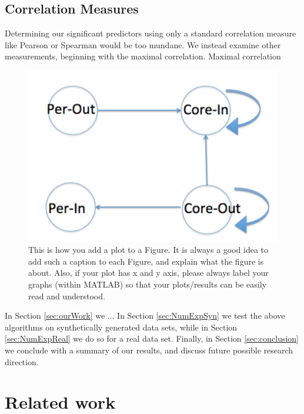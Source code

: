 \documentclass[10pt]{siamltex}
\begin{document}
\subsection{Correlation Measures}


Determining our significant predictors using only a standard correlation measure like Pearson or Spearman would be too mundane. We instead examine other measurements, beginning with the maximal correlation. Maximal correlation 




\begin{figure}[h]
\begin{center}
\includegraphics[width=0.46\columnwidth]{Directed_Core_Per}
\end{center}
\caption{This is how you add a plot to a Figure. It is always a good idea to add such a caption to each Figure, and explain what the figure is about. Also, if your plot has x and y axis, please always label your graphs (within MATLAB) so that your plots/results can be easily read and understood.}
\label{fig:DirCorPer}
\end{figure}

In Section \ref{sec:ourWork} we ... 
In Section  \ref{sec:NumExpSyn} we test the above algorithms on synthetically generated data sets, while in Section \ref{sec:NumExpReal} we do so for a real data set. Finally, in Section  \ref{sec:conclusion} we conclude with a summary of our results, and discuss future possible research direction. 



\section{Related work} \label{sec:relWork}
\end{document}
